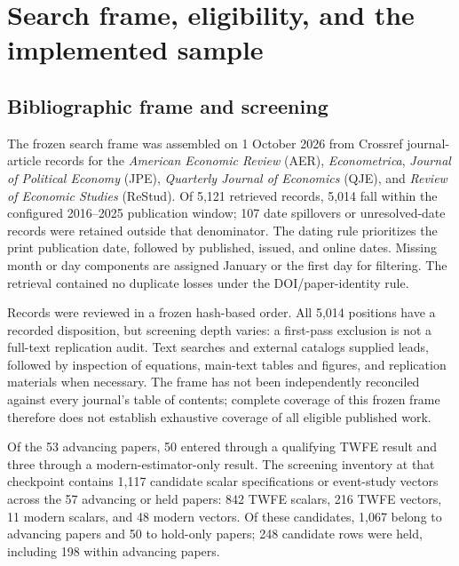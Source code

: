\documentclass[11pt,letterpaper]{article}
\begin{document}
\appendix
\section{Search frame, eligibility, and the implemented sample}
\label{app:sample}

\subsection{Bibliographic frame and screening}
The frozen search frame was assembled on 1 October 2026 from Crossref journal-article records for the \emph{American Economic Review} (AER), \emph{Econometrica}, \emph{Journal of Political Economy} (JPE), \emph{Quarterly Journal of Economics} (QJE), and \emph{Review of Economic Studies} (ReStud). Of 5,121 retrieved records, 5,014 fall within the configured 2016--2025 publication window; 107 date spillovers or unresolved-date records were retained outside that denominator. The dating rule prioritizes the print publication date, followed by published, issued, and online dates. Missing month or day components are assigned January or the first day for filtering. The retrieval contained no duplicate losses under the DOI/paper-identity rule.

Records were reviewed in a frozen hash-based order. All 5,014 positions have a recorded disposition, but screening depth varies: a first-pass exclusion is not a full-text replication audit. Text searches and external catalogs supplied leads, followed by inspection of equations, main-text tables and figures, and replication materials when necessary. The frame has not been independently reconciled against every journal's table of contents; complete coverage of this frozen frame therefore does not establish exhaustive coverage of all eligible published work.

Of the 53 advancing papers, 50 entered through a qualifying TWFE result and three through a modern-estimator-only result. The screening inventory at that checkpoint contains 1,117 candidate scalar specifications or event-study vectors across the 57 advancing or held papers: 842 TWFE scalars, 216 TWFE vectors, 11 modern scalars, and 48 modern vectors. Of these candidates, 1,067 belong to advancing papers and 50 to hold-only papers; 248 candidate rows were held, including 198 within advancing papers. 
\end{document}
